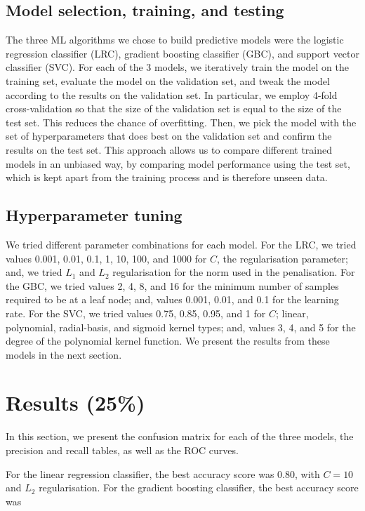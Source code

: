 \documentclass[twoside,11pt]{article}
\begin{document}
\subsection{Model selection, training, and testing}
The three ML algorithms we chose to build predictive models were the logistic regression classifier (LRC), gradient boosting classifier (GBC), and support vector classifier (SVC). For each of the 3 models, we iteratively train the model on the training set, evaluate the model on the validation set, and tweak the model according to the results on the validation set. In particular, we employ 4-fold cross-validation so that the size of the validation set is equal to the size of the test set. This reduces the chance of overfitting. Then, we pick the model with the set of hyperparameters that does best on the validation set and confirm the results on the test set. This approach allows us to compare different trained models in an unbiased way, by comparing model performance using the test set, which is kept apart from the training process and is therefore unseen data.

\subsection{Hyperparameter tuning}
We tried different parameter combinations for each model. For the LRC, we tried values 0.001, 0.01, 0.1, 1, 10, 100, and 1000 for $C$, the regularisation parameter; and, we tried $L_1$ and $L_2$ regularisation for the norm used in the penalisation. For the GBC, we tried values 2, 4, 8, and 16 for the minimum number of samples required to be at a leaf node; and, values 0.001, 0.01, and 0.1 for the learning rate. For the SVC, we tried values 0.75, 0.85, 0.95, and 1 for $C$; linear, polynomial, radial-basis, and sigmoid kernel types; and, values 3, 4, and 5 for the degree of the polynomial kernel function. We present the results from these models in the next section.

\section{Results (25\%)}
In this section, we present the confusion matrix for each of the three models, the precision and recall tables, as well as  the ROC curves.

For the linear regression classifier, the best accuracy score was 0.80, with $C=10$ and $L_2$ regularisation. For the gradient boosting classifier, the best accuracy score was 
\end{document}
